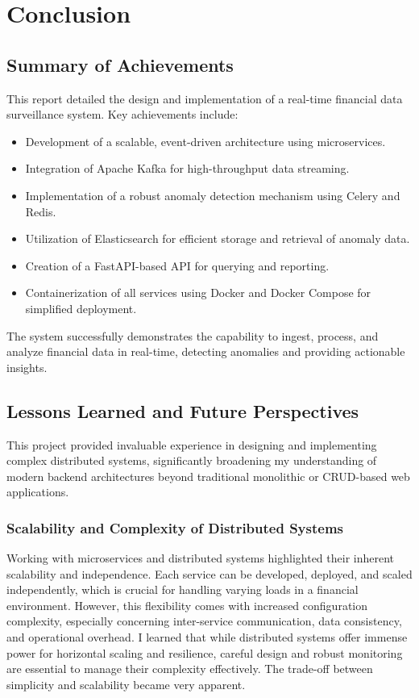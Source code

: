 \chapter{Conclusion}

\section{Summary of Achievements}
This report detailed the design and implementation of a real-time financial data surveillance system. Key achievements include:
\begin{itemize}
    \item Development of a scalable, event-driven architecture using microservices.
    \item Integration of Apache Kafka for high-throughput data streaming.
    \item Implementation of a robust anomaly detection mechanism using Celery and Redis.
    \item Utilization of Elasticsearch for efficient storage and retrieval of anomaly data.
    \item Creation of a FastAPI-based API for querying and reporting.
    \item Containerization of all services using Docker and Docker Compose for simplified deployment.
\end{itemize}
The system successfully demonstrates the capability to ingest, process, and analyze financial data in real-time, detecting anomalies and providing actionable insights.

\section{Lessons Learned and Future Perspectives}

This project provided invaluable experience in designing and implementing complex distributed systems, significantly broadening my understanding of modern backend architectures beyond traditional monolithic or CRUD-based web applications.

\subsection{Scalability and Complexity of Distributed Systems}
Working with microservices and distributed systems highlighted their inherent scalability and independence. Each service can be developed, deployed, and scaled independently, which is crucial for handling varying loads in a financial environment. However, this flexibility comes with increased configuration complexity, especially concerning inter-service communication, data consistency, and operational overhead. I learned that while distributed systems offer immense power for horizontal scaling and resilience, careful design and robust monitoring are essential to manage their complexity effectively. The trade-off between simplicity and scalability became very apparent.

